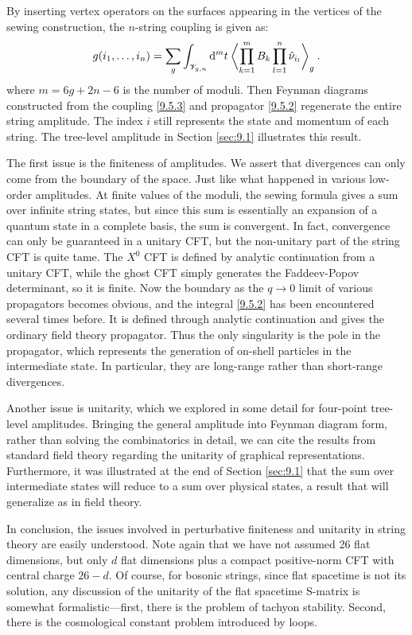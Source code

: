 By inserting vertex operators on the surfaces appearing in the vertices of the sewing construction, the $n$-string coupling is given as:
\begin{equation}
	g(i_{1}, \ldots, i_{n}) = \sum_{g} \int_{\mathscr{V}_{g, n}} \mathrm{d}^{m} t  \:
	\biggl\langle\prod_{k=1}^{m} B_{k} \prod_{l=1}^{n} \hat{\nu}_{i_{l}}\biggr\rangle_{g} \:.
	\label{9.5.3}
\end{equation}
where $m=6 g+2 n-6$ is the number of moduli. Then Feynman diagrams constructed from the coupling \eqref{9.5.3} and propagator \eqref{9.5.2} regenerate the entire string amplitude. 
The index $i$ still represents the state and momentum of each string. The tree-level amplitude in Section \ref{sec:9.1} illustrates this result.

The first issue is the finiteness of amplitudes. We assert that divergences can only come from the boundary of the space. Just like what happened in various low-order amplitudes. At finite values of the moduli, the sewing formula gives a sum over infinite string states, 
but since this sum is essentially an expansion of a quantum state in a complete basis, the sum is convergent. In fact, convergence can only be guaranteed in a unitary CFT, 
but the non-unitary part of the string CFT is quite tame.
The $X^{0}$ CFT is defined by analytic continuation from a unitary CFT, while the ghost CFT simply generates the Faddeev-Popov determinant, so it is finite. 
Now the boundary as the $q \rightarrow 0$ limit of various propagators becomes obvious, and the integral \eqref{9.5.2} has been encountered several times before. It is defined through analytic continuation and gives the ordinary field theory propagator. 
Thus the only singularity is the pole in the propagator, which represents the generation of on-shell particles in the intermediate state. In particular, they are long-range rather than short-range divergences. 

Another issue is unitarity, which we explored in some detail for four-point tree-level amplitudes.
Bringing the general amplitude into Feynman diagram form, rather than solving the combinatorics in detail, 
we can cite the results from standard field theory regarding the unitarity of graphical representations. Furthermore, it was illustrated at the end of Section \ref{sec:9.1} that the sum over intermediate states will reduce to a sum over physical states, 
a result that will generalize as in field theory. 

In conclusion, the issues involved in perturbative finiteness and unitarity in string theory are easily understood. Note again that we have not assumed 26 flat dimensions, but only $d$ flat dimensions plus a compact positive-norm CFT with central charge $26-d$. 
Of course, for bosonic strings, since flat spacetime is not its solution, any discussion of the unitarity of the flat spacetime S-matrix is somewhat formalistic—first, there is the problem of tachyon stability. Second, there is the cosmological constant problem introduced by loops.

